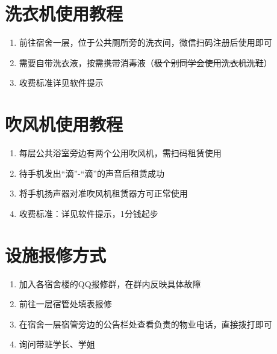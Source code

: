 \section[洗衣机使用教程]{洗衣机使用教程}
\begin{enumerate}
    \item 前往宿舍一层，位于公共厕所旁的洗衣间，微信扫码注册后使用即可
    \item 需要自带洗衣液，按需携带消毒液（\sout{极个别同学会使用洗衣机洗鞋}）
    \item 收费标准详见软件提示
\end{enumerate}

\section[吹风机使用教程]{吹风机使用教程}
\label{dry_machine}
\begin{enumerate}
    \item 每层公共浴室旁边有两个公用吹风机，需扫码\footnotemark 租赁使用
    \item 待手机发出“滴”-“滴”的声音后租赁成功
    \item 将手机扬声器对准吹风机租赁器方可正常使用
    \item 收费标准：详见软件提示，1分钱起步
\end{enumerate}

\section[设施报修方式]{设施报修方式}
\label{repair_report}
\begin{enumerate}
    \item 加入各宿舍楼的QQ报修群，在群内反映具体故障
    \item 前往一层宿管处填表报修
    \item 在宿舍一层宿管旁边的公告栏处查看负责的物业电话，直接拨打即可
    \item 询问带班学长、学姐
\end{enumerate}

